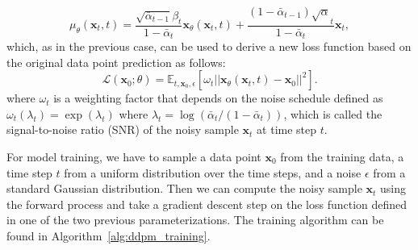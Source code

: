 \begin{itemize}
    \begin{equation}
        \mu_{\theta}(\mathbf{x}_t, t) = \frac{\sqrt{\bar{\alpha}_{t-1}}\beta_t}{1-\bar{\alpha}_t}\mathbf{x}_{\theta}(\mathbf{x}_t, t) + \frac{(1-\bar{\alpha}_{t-1})\sqrt{\alpha}_t}{1-\bar{\alpha}_t}\mathbf{x}_t,
    \end{equation}
    which, as in the previous case, can be used to derive a new loss function based on the original data point prediction as follows:
    \begin{equation}
        \mathcal{L}(\mathbf{x}_0;\theta) = \mathbb{E}_{t, \mathbf{x}_0, \epsilon} \left[\omega_t||\mathbf{x}_{\theta}(\mathbf{x}_t, t) - \mathbf{x}_0||^2 \right].
    \end{equation}
    where $\omega_t$ is a weighting factor that depends on the noise schedule defined as $\omega_t(\lambda_t) = \exp(\lambda_t)$ where $\lambda_t = \log(\bar\alpha_t / (1-\bar\alpha_t))$, which is called 
    the signal-to-noise ratio (SNR) of the noisy sample $\mathbf{x}_t$ at time step $t$. 
\end{itemize}
For model training, we have to sample a data point $\mathbf{x}_0$ from the training data, a time step $t$ from a uniform distribution over the time steps, and a noise $\epsilon$ from a standard Gaussian distribution. 
Then we can compute the noisy sample $\mathbf{x}_t$ using the forward process and take a gradient descent step on the loss function defined in one of the two previous parameterizations. The training algorithm 
can be found in Algorithm~\ref{alg:ddpm_training}.
\begin{algorithm}[ht]
\caption{Training in DDPMs} \label{alg:ddpm_training}
\end{algorithm}


